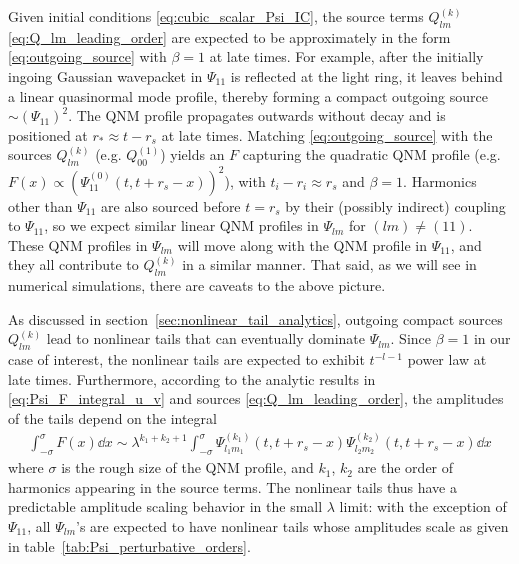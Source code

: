 \documentclass[reprint,aps,physrev,superscriptaddress,10pt,notitlepage,prd,nofootinbib,onecolumn]{revtex4-2}
\newcommand{\tref}[1]{table~\ref{#1}}
\newcommand{\sref}[1]{section~\ref{#1}}
\begin{document}
Given initial conditions \eqref{eq:cubic_scalar_Psi_IC}, the source terms $Q_{lm}^{(k)}$ \eqref{eq:Q_lm_leading_order} are expected to be approximately in the form \eqref{eq:outgoing_source} with $\beta=1$ at late times.
For example, after the initially ingoing Gaussian wavepacket in $\Psi_{11}$ is reflected at the light ring, it leaves behind a linear quasinormal mode profile, thereby forming a compact outgoing source $\sim (\Psi_{11})^2$.
The QNM profile propagates outwards without decay and is positioned at $r_* \approx t - r_s$ at late times.
Matching \eqref{eq:outgoing_source} with the sources $Q_{lm}^{(k)}$ (e.g. $Q_{00}^{(1)}$) yields an $F$ capturing the quadratic QNM profile (e.g. $F(x) \propto (\Psi_{11}^{(0)}(t,t+r_s-x))^2$), with $t_i-r_i \approx r_s$ and $\beta = 1$.
Harmonics other than $\Psi_{11}$ are also sourced before $t = r_s$ by their (possibly indirect) coupling to $\Psi_{11}$, so we expect similar linear QNM profiles in $\Psi_{lm}$  for $(lm) \neq (11)$.
These QNM profiles in $\Psi_{lm}$ will move along with the QNM profile in $\Psi_{11}$, and they all contribute to $Q_{lm}^{(k)}$ in a similar manner.
That said, as we will see in numerical simulations, there are caveats to the above picture.



As discussed in \sref{sec:nonlinear_tail_analytics}, outgoing compact sources $Q_{lm}^{(k)}$ lead to nonlinear tails that can eventually dominate $\Psi_{lm}$.
Since $\beta = 1$ in our case of interest, the nonlinear tails are expected to exhibit $t^{-l-1}$ power law at late times.
Furthermore, according to the analytic results in \eqref{eq:Psi_F_integral_u_v} and sources \eqref{eq:Q_lm_leading_order}, the amplitudes of the tails depend on the integral
\begin{align}
  \label{eq:approximate_F}
  \int_{-\sigma}^\sigma F(x) \dd{x} \sim \lambda^{k_1 + k_2 + 1} \int_{-\sigma}^\sigma \Psi_{l_1 m_1}^{(k_1)}(t,t+r_s-x) \Psi_{l_2 m_2}^{(k_2)}(t,t+r_s-x) \dd{x}
\end{align}
where $\sigma$ is the rough size of the QNM profile, and $k_1$, $k_2$ are the order of harmonics appearing in the source terms.
The nonlinear tails thus have a predictable amplitude scaling behavior in the small $\lambda$ limit: with the exception of $\Psi_{11}$, all $\Psi_{lm}$'s are expected to have nonlinear tails whose amplitudes scale as given in \tref{tab:Psi_perturbative_orders}.
\end{document}
